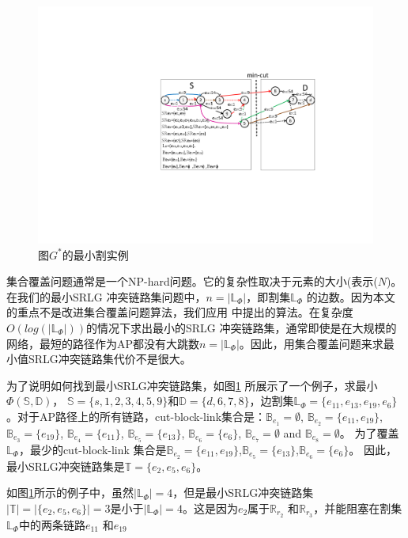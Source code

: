 \begin{figure}[htbp]
  \centering
  \includegraphics[width=4.5in]{figures/MinCutStarGraph}
  \caption{图$G^*$的最小割实例}\label{fig:MinCutStarGraph}
  \label{fig:MinCutStarGraph}
\end{figure}

集合覆盖问题通常是一个NP-hard问题。它的复杂性取决于元素的大小(表示($N$)。 在我们的最小SRLG 冲突链路集问题中，$n=|\mathbb{L}_{\Phi}|$，即割集$\mathbb{L}_{\Phi}$ 的边数。因为本文的重点不是改进集合覆盖问题算法，我们应用\cite{chvatal1979greedy} 中提出的算法。在复杂度$O(log(|\mathbb{L}_{\Phi}|))$的情况下求出最小的SRLG 冲突链路集，通常即使是在大规模的网络，最短的路径作为AP都没有大跳数$n=|\mathbb{L}_{\Phi}|$。因此，用集合覆盖问题来求最小值SRLG冲突链路集代价不是很大。

为了说明如何找到最小SRLG冲突链路集，如图\ref{fig:MinCutStarGraph} 所展示了一个例子，求最小$\Phi(\mathbb{S},\mathbb{D})$， $\mathbb{S}=\{s, 1, 2, 3, 4, 5, 9\}$和$\mathbb{D}=\{d, 6, 7, 8\}$，边割集$\mathbb{L}_{\Phi}=\{e_{11},e_{13},e_{19},e_{6}\}$。对于AP路径上的所有链路，cut-block-link集合是：$\mathbb{B}_{e_1}=\emptyset$, $\mathbb{B}_{e_2}=\{e_{11},e_{19}\}$, $\mathbb{B}_{e_3}=\{e_{19}\}$, $\mathbb{B}_{e_4}=\{e_{11}\}$, $\mathbb{B}_{e_5}=\{e_{13}\}$, $\mathbb{B}_{e_6}=\{e_6\}$, $\mathbb{B}_{e_7}=\emptyset$ and $\mathbb{B}_{e_8}=\emptyset$。 为了覆盖$\mathbb{L}_{\Phi}$，最少的cut-block-link 集合是$\mathbb{B}_{e_2}=\{e_{11},e_{19}\}$,$\mathbb{B}_{e_5}=\{e_{13}\}$,$\mathbb{B}_{e_6}=\{e_6\}$。 因此，最小SRLG冲突链路集是$\mathbb{T}=\{e_2, e_5, e_6 \}$。

如图\ref{fig:MinCutStarGraph}所示的例子中，虽然$|\mathbb{L}_{\Phi}|=4$，但是最小SRLG冲突链路集$|\mathbb{T}|=|\{e_2, e_5, e_6 \}|=3$是小于$|\mathbb{L}_{\Phi}|=4$。这是因为$e_2$属于$\mathbb{R}_{r_2}$ 和$\mathbb{R}_{r_3}$，并能阻塞在割集$\mathbb{L}_{\Phi}$中的两条链路$e_{11}$ 和$e_{19}$


